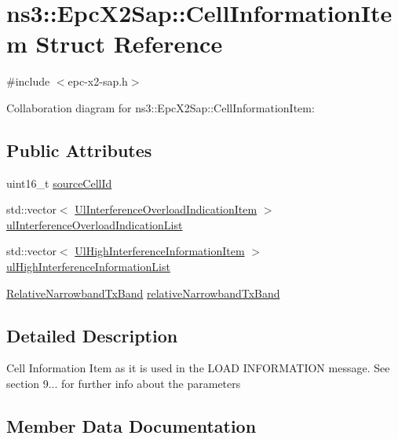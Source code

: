 \hypertarget{structns3_1_1EpcX2Sap_1_1CellInformationItem}{}\section{ns3\+:\+:Epc\+X2\+Sap\+:\+:Cell\+Information\+Item Struct Reference}
\label{structns3_1_1EpcX2Sap_1_1CellInformationItem}


{\ttfamily \#include $<$epc-\/x2-\/sap.\+h$>$}



Collaboration diagram for ns3\+:\+:Epc\+X2\+Sap\+:\+:Cell\+Information\+Item\+:
\subsection*{Public Attributes}
\begin{DoxyCompactItemize}
\item 
uint16\+\_\+t \hyperlink{structns3_1_1EpcX2Sap_1_1CellInformationItem_a218d51d3f656b2401d09825de510e648}{source\+Cell\+Id}
\item 
std\+::vector$<$ \hyperlink{classns3_1_1EpcX2Sap_a4b1ca2b446488bf6f640c6cdce42aaf9}{Ul\+Interference\+Overload\+Indication\+Item} $>$ \hyperlink{structns3_1_1EpcX2Sap_1_1CellInformationItem_af3d3f8711f0efe24d1d2d0997a5728ca}{ul\+Interference\+Overload\+Indication\+List}
\item 
std\+::vector$<$ \hyperlink{structns3_1_1EpcX2Sap_1_1UlHighInterferenceInformationItem}{Ul\+High\+Interference\+Information\+Item} $>$ \hyperlink{structns3_1_1EpcX2Sap_1_1CellInformationItem_a2485387ca7c0650d2a5885600578d51a}{ul\+High\+Interference\+Information\+List}
\item 
\hyperlink{structns3_1_1EpcX2Sap_1_1RelativeNarrowbandTxBand}{Relative\+Narrowband\+Tx\+Band} \hyperlink{structns3_1_1EpcX2Sap_1_1CellInformationItem_a53d90f67e97b2fed73d8dc9502e33fba}{relative\+Narrowband\+Tx\+Band}
\end{DoxyCompactItemize}


\subsection{Detailed Description}
Cell Information Item as it is used in the L\+O\+AD I\+N\+F\+O\+R\+M\+A\+T\+I\+ON message. See section 9... for further info about the parameters 

\subsection{Member Data Documentation}
